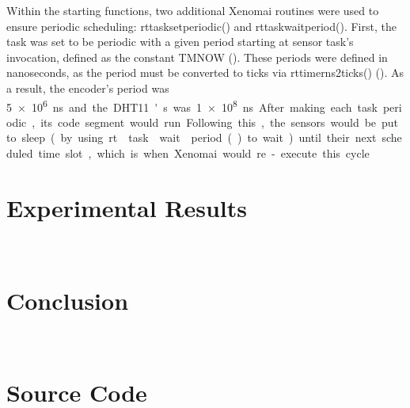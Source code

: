 \documentclass[letterpaper, 12pt]{article}
\begin{document}
\indent Within the starting functions, two additional Xenomai routines were used to ensure periodic scheduling: rt\textunderscore task\textunderscore set\textunderscore periodic() and rt\textunderscore task\textunderscore wait\textunderscore period().  First, the task was set to be periodic with a given period starting at sensor task's invocation, defined as the constant TM\textunderscore NOW (\cite{xenomai2018}).  These periods were defined in nanoseconds, as the period must be converted to ticks via rt\textunderscore timer\textunderscore ns2ticks() (\cite{xenomai2018}).  As a result, the encoder's period was \SI{5e6} ns and the DHT11's was \SI{1e8} ns.  After making each task periodic, its code segment would run.  Following this, the sensors would be put to sleep (by using rt\textunderscore task\textunderscore wait\textunderscore period() to wait) until their next scheduled time slot, which is when Xenomai would re-execute this cycle.
~\newpage
\section{Experimental Results}
~\newpage
\section{Conclusion}

~\newpage
\printbibliography
~\newpage
\section{Source Code}

\end{document}
